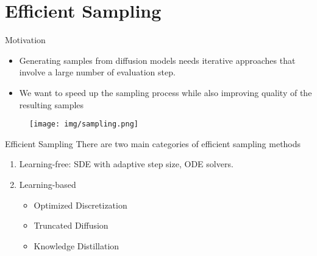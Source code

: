 \section{Efficient Sampling}

\begin{frame}{Motivation}
\begin{itemize}
    \item Generating samples from diffusion models needs iterative approaches that involve a large number of evaluation step.
    \item We want to speed up the sampling process while also improving quality of the resulting samples
\end{itemize}
\begin{figure}
    \centering
    \texttt{[image: img/sampling.png]}
    \label{fig:enter-label}
\end{figure}

\end{frame}

\begin{frame}{Efficient Sampling}
There are two main categories of efficient sampling methods
\begin{enumerate}
    \item Learning-free: SDE with adaptive step size, ODE solvers.
    \item Learning-based
    \begin{itemize}
        \item Optimized Discretization
        \item Truncated Diffusion
        \item Knowledge Distillation
    \end{itemize}
\end{enumerate}
\end{frame}